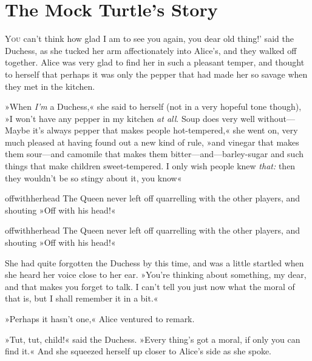 \chapter{The Mock Turtle's Story}

\lettrine[lines=4,findent=2pt,ante=`]{Y}{ou} can't think how glad I am to see you again, you dear old thing!' said the Duchess, as she tucked her arm affectionately into Alice's, and they walked off together.
Alice was very glad to find her in such a pleasant temper, and thought to herself that perhaps it was only the pepper that had made her so savage when they met in the kitchen.

»When \textit{I'm} a Duchess,« she said to herself (not in a very hopeful tone though), »I won't have any pepper in my kitchen \textit{at all}. Soup does very well without—Maybe it's always pepper that makes people hot-tempered,« she went on, very much pleased at having found out a new kind of rule, »and vinegar that makes them sour—and camomile that makes them bitter—and—barley-sugar and such things that make children sweet-tempered. I only wish people knew \textit{that:} then they wouldn't be so stingy about it, you know\longdash«


\begin{pictures}
	\begin{letter}
		\begin{colorbigpic}
			[1.1]
			{offwithherhead}
			{The Queen never left off quarrelling with the other players, and shouting »Off with his head!«}
		\end{colorbigpic}
	\end{letter}
	
	\begin{a4}
		\begin{colorbigpic}
			[1.0]
			{offwithherhead}
			{The Queen never left off quarrelling with the other players, and shouting »Off with his head!«}
		\end{colorbigpic}
	\end{a4}	
\end{pictures}


She had quite forgotten the Duchess by this time, and was a little startled when she heard her voice close to her ear. »You're thinking about something, my dear, and that makes you forget to talk. I can't tell you just now what the moral of that is, but I shall remember it in a bit.«

»Perhaps it hasn't one,« Alice ventured to remark.

»Tut, tut, child!« said the Duchess. »Every thing's got a moral, if only you can find it.« And she squeezed herself up closer to Alice's side as she spoke.

